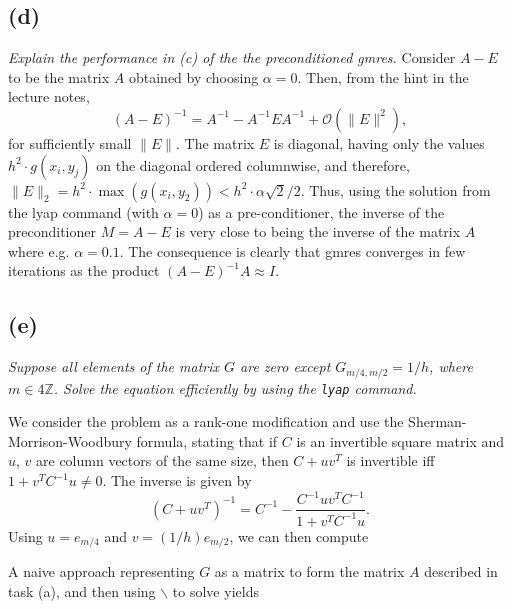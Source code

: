 \subsection*{(d)}
\emph{Explain the performance in (c) of the the preconditioned gmres. 
}
Consider $A-E$ to be the matrix $A$ obtained by choosing $\alpha = 0$. Then, from the hint in the lecture notes, 
\begin{equation}
(A-E)^{-1} = A^{-1}-A^{-1}EA^{-1}+\mathcal O(\|E\|^2),
\end{equation}
for sufficiently small $\|E\|$. The matrix $E$ is diagonal, having only the values $h^2\cdot g(x_i,y_j)$ on the diagonal ordered columnwise, and therefore, $\|E\|_2 = h^2\cdot \max(g(x_i,y_2))<h^2\cdot\alpha \sqrt{2}/2$. Thus, using the solution from the lyap command (with $\alpha = 0$) as a pre-conditioner, the inverse of the preconditioner $M=A-E$ is very close to being the inverse of the matrix $A$ where e.g. $\alpha = 0.1$. The consequence is clearly that gmres converges in few iterations as the product $(A-E)^{-1}A\approx I$. 

\subsection*{(e)}
\emph{Suppose all elements of the matrix $G$ are zero except $G_{m/4,m/2} = 1/h$, where $m\in 4\mathbb Z$. Solve the equation efficiently by using the \texttt{lyap} command.}

We consider the problem as a rank-one modification and use the Sherman-Morrison-Woodbury formula, stating that if $C$ is an invertible square matrix and $u$, $v$ are column vectors of the same size, then $C+uv^T$ is invertible iff $1+v^TC^{-1}u\neq 0$. The inverse is given by
\begin{equation}
(C+uv^T)^{-1} = C^{-1}-\frac{C^{-1}uv^TC^{-1}}{1+v^TC^{-1}u}.
\end{equation}
Using $u = e_{m/4}$ and $v  = (1/h)e_{m/2}$, we can then compute 

A naive approach representing $G$ as a matrix to form the matrix $A$ described in task (a), and then using $\backslash$ to solve yields 





